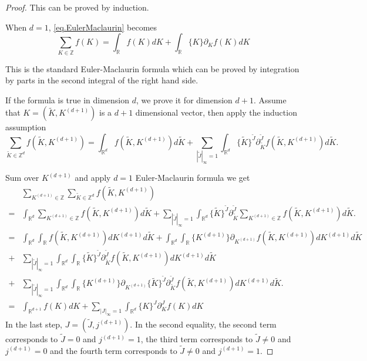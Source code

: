 \begin{proof}
This can be proved by induction.

When $d=1$, \eqref{eq.EulerMaclaurin} becomes
\begin{equation}
    \sum_{K\in\mathbb{Z}} f(K)=\int_{\mathbb{R}} f(K)dK+\int_{\mathbb{R}} \{K\} \partial_K f(K) dK
\end{equation}

This is the standard Euler-Maclaurin formula which can be proved by integration by parts in the second integral of the right hand side.

If the formula is true in dimension $d$, we prove it for dimension $d+1$. Assume that $K=(\widetilde{K},K^{(d+1)})$ is a $d+1$ dimensional vector, then apply the induction assumption 
\begin{equation}
    \sum_{\widetilde{K}\in\mathbb{Z}^d} f(\widetilde{K},K^{(d+1)})=\int_{\mathbb{R}^d} f(\widetilde{K},K^{(d+1)})d\widetilde{K}+\sum_{ |\widetilde{J}|_{\infty} = 1}\int_{\mathbb{R}^d} \{\widetilde{K}\}^{\widetilde{J}} \partial_{\widetilde{K}}^{\widetilde{J}}f(\widetilde{K},K^{(d+1)}) d\widetilde{K}.
\end{equation}

Sum over $K^{(d+1)}$ and apply $d=1$ Euler-Maclaurin formula we get
\begin{equation}
\begin{split}
    &\sum_{K^{(d+1)}\in\mathbb{Z}}\sum_{\widetilde{K}\in\mathbb{Z}^d} f(\widetilde{K},K^{(d+1)})
    \\
    =&\int_{\mathbb{R}^d} \sum_{K^{(d+1)}\in\mathbb{Z}}f(\widetilde{K},K^{(d+1)})d\widetilde{K}+\sum_{ |\widetilde{J}|_{\infty} = 1}\int_{\mathbb{R}^d} \{\widetilde{K}\}^{\widetilde{J}} \partial_{\widetilde{K}}^{\widetilde{J}}\sum_{K^{(d+1)}\in\mathbb{Z}}f(\widetilde{K},K^{(d+1)}) d\widetilde{K}.
    \\
    =&\int_{\mathbb{R}^d} \int_{\mathbb{R}}f(\widetilde{K},K^{(d+1)})dK^{(d+1)} d\widetilde{K}+\int_{\mathbb{R}^d} \int_{\mathbb{R}}\{K^{(d+1)}\}\partial_{K^{(d+1)}}f(\widetilde{K},K^{(d+1)})dK^{(d+1)} d\widetilde{K}
    \\
    +&\sum_{ |\widetilde{J}|_{\infty} = 1}\int_{\mathbb{R}^d}\int_{\mathbb{R}} \{\widetilde{K}\}^{\widetilde{J}} \partial_{\widetilde{K}}^{\widetilde{J}}f(\widetilde{K},K^{(d+1)})dK^{(d+1)} d\widetilde{K}
    \\
    +&\sum_{ |\widetilde{J}|_{\infty} = 1}\int_{\mathbb{R}^d}\int_{\mathbb{R}}\{K^{(d+1)}\}\partial_{K^{(d+1)}} \{\widetilde{K}\}^{\widetilde{J}} \partial_{\widetilde{K}}^{\widetilde{J}}f(\widetilde{K},K^{(d+1)})dK^{(d+1)} d\widetilde{K}.
    \\
    =&\int_{\mathbb{R}^{d+1}} f(K)dK + \sum_{ |J|_{\infty} = 1}\int_{\mathbb{R}^d} \{K\}^{J} \partial_K^{J}f(K) dK
\end{split}
\end{equation}
In the last step, $J=(\widetilde{J},j^{(d+1)})$. In the second equality, the second term corresponds to $\widetilde{J}=0$ and $j^{(d+1)}=1$, the third term corresponds to $\widetilde{J}\ne 0$ and $j^{(d+1)}=0$ and the fourth term corresponds to $\widetilde{J}\ne 0$ and $j^{(d+1)}=1$.
\end{proof}
